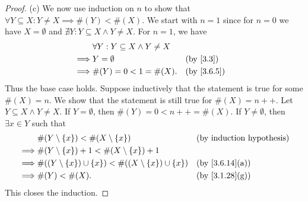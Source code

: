 \begin{proof}{(c)}
  We now use induction on \(n\) to show that \(\forall Y \subseteq X : Y \neq X \implies \#(Y) < \#(X)\).
  We start with \(n = 1\) since for \(n = 0\) we have \(X = \emptyset\) and \(\nexists Y : Y \subseteq X \land Y \neq X\).
  For \(n = 1\), we have
  \begin{align*}
             & \forall Y : Y \subseteq X \land Y \neq X                             \\
    \implies & Y = \emptyset                            &  & \text{(by \cref{3.3})} \\
    \implies & \#(Y) = 0 < 1 = \#(X).                   &  & \by{3.6.5}
  \end{align*}
  Thus the base case holds.
  Suppose inductively that the statement is true for some \(\#(X) = n\).
  We show that the statement is still true for \(\#(X) = n++\).
  Let \(Y \subseteq X \land Y \neq X\).
  If \(Y = \emptyset\), then \(\#(Y) = 0 < n++ = \#(X)\).
  If \(Y \neq \emptyset\), then \(\exists x \in Y\) such that
  \begin{align*}
             & \#(Y \setminus \set{x}) < \#(X \setminus \set{x})                               &  & \byIH                        \\
    \implies & \#(Y \setminus \set{x}) + 1 < \#(X \setminus \set{x}) + 1                                                         \\
    \implies & \#((Y \setminus \set{x}) \cup \set{x}) < \#((X \setminus \set{x}) \cup \set{x}) &  & \text{(by \cref{3.6.14}(a))} \\
    \implies & \#(Y) < \#(X).                                                                  &  & \text{(by \cref{3.1.28}(g))}
  \end{align*}
  This closes the induction.
\end{proof}

